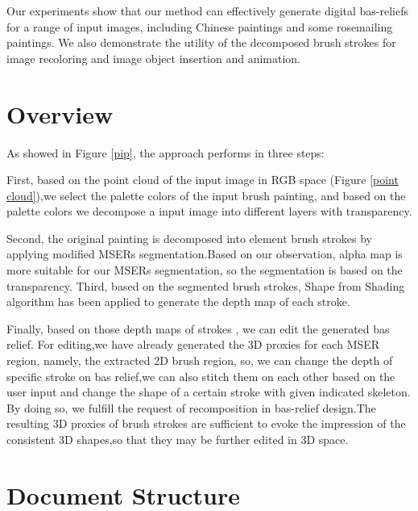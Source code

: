 Our experiments show that our method can effectively generate digital bas-reliefs for a range of input images, including Chinese paintings and some rosemailing paintings. 
We also demonstrate the utility of the decomposed brush strokes for image recoloring and image object insertion and animation.

\section{Overview}  As showed in Figure \ref{pip}, the approach performs in three steps:

First, based on the point cloud of the input image in RGB space (Figure \ref{point cloud}),we select the palette colors of the input brush painting, and based on the palette colors we decompose a input image into different layers with transparency.  

Second,  the original painting is decomposed into element brush strokes by applying modified MSERs segmentation.Based on our observation, alpha map is more suitable for our MSERs segmentation, so the segmentation is based on the transparency. Third, based on the segmented brush strokes,  Shape from Shading algorithm has been applied to generate the depth map of each stroke.  

Finally, based on those depth maps of strokes , we can edit the generated bas relief. For editing,we have already generated the 3D proxies for each MSER region, namely, the extracted 2D brush region, so, we can change the depth of specific stroke on bas relief,we can also stitch them on each other based on the user input and change the shape of a certain stroke with given indicated skeleton. By doing so, we fulfill the request of recomposition in bas-relief design.The resulting 3D proxies of brush strokes are sufficient to evoke the impression of the consistent 3D shapes,so that they may be further edited in 3D space. 



\section{Document Structure}


\newpage